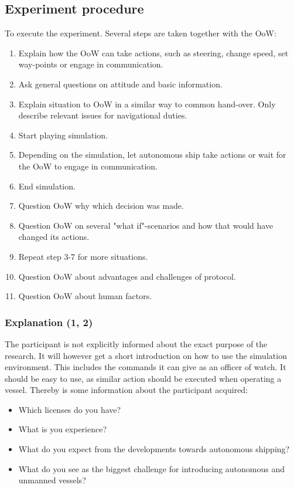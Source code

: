 \subsection{Experiment procedure}
To execute the experiment. Several steps are taken together with the \acf{OoW}:
\begin{enumerate}
	\item Explain how the OoW can take actions, such as steering, change speed, set way-points or engage in communication.
	\item Ask general questions on attitude and basic information.
	\item Explain situation to OoW in a similar way to common hand-over. Only describe relevant issues for navigational duties.
	\item Start playing simulation.
	\item Depending on the simulation, let autonomous ship take actions or wait for the OoW to engage in communication.
	\item End simulation.
	\item Question OoW why which decision was made.
	\item Question OoW on several "what if"-scenarios and how that would have changed its actions.
	\item Repeat step 3-7 for more situations.
	\item Question OoW about advantages and challenges of protocol.
	\item Question OoW about human factors.
\end{enumerate}

\subsubsection{Explanation (1, 2)}
The participant is not explicitly informed about the exact purpose of the research. It will however get a short introduction on how to use the simulation environment. This includes the commands it can give as an officer of watch. It should be easy to use, as similar action should be executed when operating a vessel. Thereby is some information about the participant acquired:
\begin{itemize}
	\item Which licenses do you have?
	\item What is you experience?
	\item What do you expect from the developments towards autonomous shipping?
	\item What do you see as the biggest challenge for introducing autonomous and unmanned vessels?
\end{itemize}


